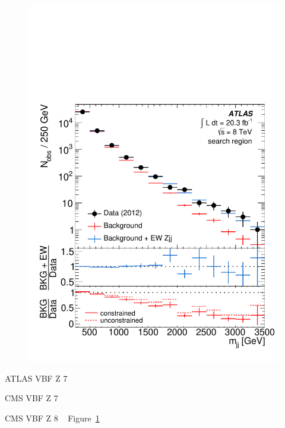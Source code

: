 \begin{figure}[p]
    \centering
    \includegraphics[height=0.3\textheight]{figures/ss-exclboson-z2j-atlas8tev.pdf}
    \caption{}
    \label{fig:ss-exclboson-z2j-atlas8tev}
\end{figure}
ATLAS VBF Z 7 \TeV~\cite{Aad:2014dta}

CMS VBF Z 7 \TeV~\cite{Chatrchyan:2013jya}

CMS VBF Z 8 \TeV~\cite{Khachatryan:2014dea}
Figure~\ref{fig:ss-exclboson-z2j-atlas8tev}
